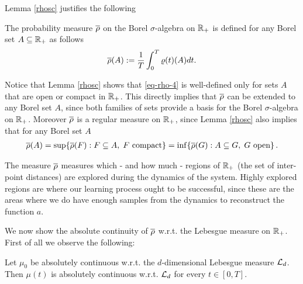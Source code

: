 Lemma \ref{rhosc} justifies the following
\begin{definition}
The probability measure $\overline\rho$ on the Borel $\sigma$-algebra on $\mathbb{R}_+$ is defined for any Borel set $A \subseteq \mathbb{R}_+$ as follows
\begin{align}\label{eq-rho-4}
	\overline\rho(A):=\frac{1}{T}\int_0^T\varrho(t)(A)dt.
\end{align}
\end{definition}
Notice that Lemma \ref{rhosc} shows that \eqref{eq-rho-4} is well-defined only for sets $A$ that are open or compact in $\mathbb{R}_+$. This directly implies that $\overline\rho$ can be extended to any Borel set $A$, since both families of sets provide a basis for the Borel $\sigma$-algebra on $\mathbb{R}_+$. Moreover $\overline\rho$ is a regular measure on $\mathbb{R}_+$, since Lemma \ref{rhosc} also implies that for any Borel set $A$
\begin{align*}
	\overline\rho(A) =  \sup\{\overline\rho(F) : F \subseteq A, \;F \text{ compact}\} = \inf\{\overline\rho(G) : A \subseteq G, \;G \text{ open}\}\,.
\end{align*}

\vspace{0.3cm}

The measure $\overline\rho$ measures which - and how much - regions of $\mathbb{R}_+$ (the set of inter-point distances) are explored during the dynamics of the system. Highly explored regions are where our learning process ought to be successful, since these are the areas where we do have enough samples from the dynamics to reconstruct the function $a$.

We now show the absolute continuity of $ \overline\rho$ w.r.t. the Lebesgue measure on $\mathbb{R}_+$. First of all we observe the following:

\begin{lemma}\label{lemma-AC-1}
	Let $\mu_0$ be absolutely continuous w.r.t. the $d$-dimensional Lebesgue measure $\mathcal{L}_d$. Then $\mu(t)$ is absolutely continuous w.r.t. $\mathcal{L}_d$ for every $t\in [0,T]$.
\end{lemma}

